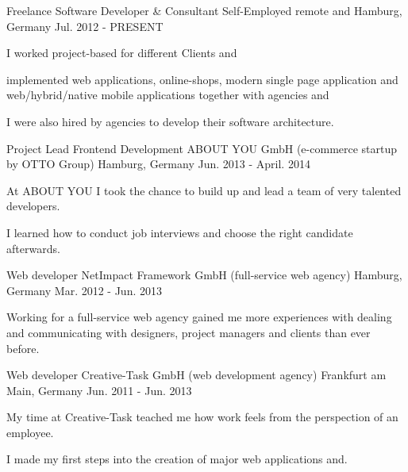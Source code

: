 

\begin{cventries}

\cventry
  {Freelance Software Developer \& Consultant}
  {Self-Employed}
  {remote and Hamburg, Germany}
  {Jul. 2012 - PRESENT}
  {
    \begin{cvitems}
      \item {I worked project-based for different Clients and}
      \item {implemented web applications, online-shops, modern single page application and web/hybrid/native mobile applications together with agencies and}
      \item {I were also hired by agencies to develop their software architecture.}
    \end{cvitems}
  }
\cventry
  {Project Lead Frontend Development}
  {ABOUT YOU GmbH (e-commerce startup by OTTO Group)}
  {Hamburg, Germany}
  {Jun. 2013 - April. 2014}
  {
    \begin{cvitems}
      \item {At ABOUT YOU I took the chance to build up and lead a team of very talented developers.}
      \item {I learned how to conduct job interviews and choose the right candidate afterwards.}
    \end{cvitems}
  }
\cventry
  {Web developer}
  {NetImpact Framework GmbH (full-service web agency)}
  {Hamburg, Germany}
  {Mar. 2012 - Jun. 2013}
  {
    \begin{cvitems}
      \item {Working for a full-service web agency gained me more experiences with dealing and communicating with designers, project managers and clients than ever before.}
    \end{cvitems}
  }
\cventry
  {Web developer}
  {Creative-Task GmbH (web development agency)}
  {Frankfurt am Main, Germany}
  {Jun. 2011 - Jun. 2013}
  {
    \begin{cvitems}
      \item {My time at Creative-Task teached me how work feels from the perspection of an employee.}
      \item {I made my first steps into the creation of major web applications and.}

\end{cvitems}}
\end{cventries}

